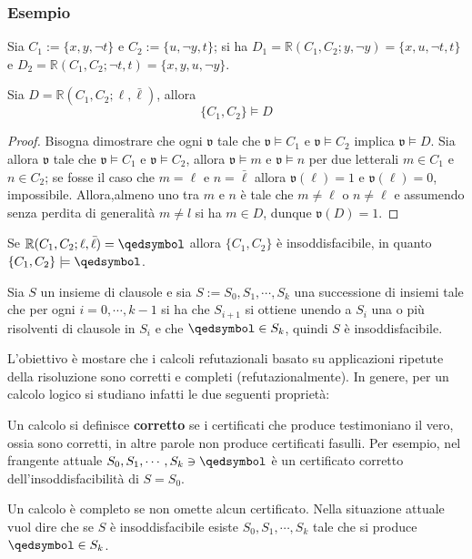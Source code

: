 \subsubsection{Esempio}
Sia $C_1 := \{x, y, \neg t\}$ e $C_2 := \{u, \neg y, t\}$; 
si ha $D_1 = \mathbb{R}(C_1, C_2; y, \neg y) = \{x, u, \neg t, t\}$ e 
$D_2 = \mathbb{R}(C_1, C_2; \neg t, t) = \{x, y, u, \neg y\}$. 

\begin{lem}
        Sia $D = \mathbb{R}(C_1, C_2; \ell, \bar{\ell})$, allora 
        $$
        \{C_1, C_2\} \models D
        $$
\end{lem}

\begin{proof}
        Bisogna dimostrare che ogni $\mathfrak{v}$ tale che $\mathfrak{v} \models C_1$ 
        e $\mathfrak{v} \models C_2$ implica $\mathfrak{v} \models D$. Sia allora 
        $\mathfrak{v}$ tale che $\mathfrak{v} \models C_1$ 
        e $\mathfrak{v} \models C_2$, allora $\mathfrak{v} \models m$ e 
        $\mathfrak{v} \models n$ per due letterali $m \in C_1$ e $n \in C_2$; 
        se fosse il caso che $m = \ell$ e  $n = \bar{\ell}$ allora 
        $\mathfrak{v}(\ell) = 1$ e $\mathfrak{v}(\ell) = 0$, impossibile. 
        Allora,almeno uno tra $m$ e $n$ è tale che $m \neq \ell$ o $n \neq \ell$ 
        e assumendo senza perdita di generalità $m \neq l$ si ha 
        $m \in D$, dunque $\mathfrak{v}(D) = 1$. 
\end{proof}

\begin{cor}
        Se $\mathbb{R}(C_1, C_2; \ell, \bar{\ell}) = \qedsymbol$ allora 
        $\{C_1, C_2\}$ è insoddisfacibile, in quanto $\{C_1, C_2\} \models \qedsymbol$.
\end{cor}
\begin{cor}
        Sia $S$ un insieme di clausole e sia $S := S_0, S_1, \cdots, S_k$ una 
        successione di insiemi tale che per ogni $i = 0, \cdots, k-1$ 
        si ha che $S_{i+1}$ si ottiene unendo a $S_i$ una o più risolventi 
        di clausole in $S_i$ e che $\qedsymbol \in S_k$, quindi $S$ è 
        insoddisfacibile.
\end{cor}
L'obiettivo è mostare che i calcoli refutazionali basato su applicazioni 
ripetute della risoluzione sono corretti e completi (refutazionalmente).
In genere, per un calcolo logico si studiano infatti le due
seguenti proprietà:
\begin{defi}[Correttezza]
        Un calcolo si definisce \textbf{corretto} se i certificati che produce 
        testimoniano il vero, ossia sono corretti, in altre parole 
        non produce certificati fasulli. Per esempio, nel frangente attuale 
        $S_0, S_1, \cdots, S_k \ni \qedsymbol$ è un certificato 
        corretto dell'insoddisfacibilità di $S = S_0$. 
\end{defi}
\begin{defi}[Completezza]
        Un calcolo è completo se non omette alcun certificato. Nella situazione 
        attuale vuol dire che se $S$ è insoddisfacibile esiste $S_0, S_1, \cdots, S_k$ 
        tale che si produce $\qedsymbol \in S_k$.
\end{defi}

